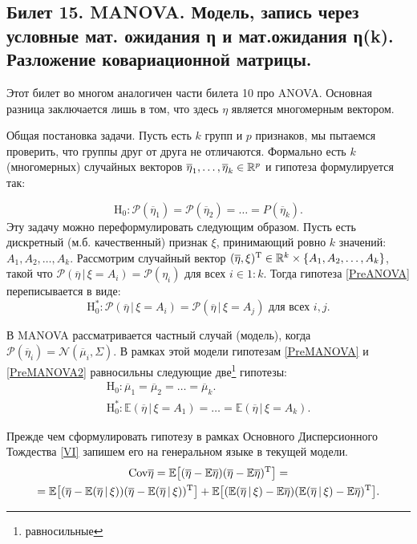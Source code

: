 \subsection{ Билет 15. MANOVA. Модель, запись через условные мат. ожидания η и мат.ожидания
η(k). Разложение ковариационной матрицы. }
Этот билет во многом аналогичен части билета 10 про ANOVA.
Основная разница заключается лишь в том, что здесь $\eta$ является многомерным вектором.

Общая постановка задачи.
Пусть есть $k$ групп и $p$ признаков, мы пытаемся проверить, что группы друг от друга не отличаются.
Формально есть $k$ (многомерных) случайных векторов $\overline \eta_1, \ldots, \overline \eta_k \in \mathbb{R}^p$ и гипотеза формулируется так:

\begin{equation}
    \label{PreMANOVA}
    \mathrm H_0: \mathcal P(\overline \eta_1) = \mathcal P(\overline \eta_2) = \ldots \mathcal = P(\overline \eta_k).
\end{equation}
Эту задачу можно переформулировать следующим образом.
Пусть есть дискретный (м.б. качественный) признак $\xi$, принимающий ровно $k$ значений: $A_1, A_2, \ldots, A_k$.
Рассмотрим случайный вектор $(\overline \eta, \xi)^{\mathrm{T}} \in \mathbb{R}^k \times \{A_1, A_2, \ldots, A_k\}$,
такой что $\mathcal P(\overline \eta \, | \, \xi = A_i) = \mathcal P(\eta_i)$ для всех $i \in 1:k$.
Тогда гипотеза \eqref{PreANOVA} переписывается в виде:
\begin{equation}
    \label{PreMANOVA2}
    \mathrm H_0^*: \mathcal P(\overline \eta \, | \, \xi = A_i) = \mathcal P(\overline \eta \, | \, \xi = A_j) \text{ для всех $i, j$}.
\end{equation}

В MANOVA рассматривается частный случай (модель), когда $\mathcal P(\overline \eta_i) = \mathcal N(\overline \mu_i, \Sigma)$.
В рамках этой модели гипотезам \eqref{PreMANOVA} и \eqref{PreMANOVA2} равносильны следующие две\footnote{равносильные} гипотезы:
\begin{gather}
    \label{MANOVA}
    \mathrm H_0: \overline \mu_1 = \overline \mu_2 = \ldots = \overline \mu_k.\\
    \mathrm H_0^*: \mathbb E (\overline \eta \, | \, \xi = A_1) = \ldots = \mathbb E (\overline \eta \, | \, \xi = A_k).
    \nonumber
\end{gather}

Прежде чем сформулировать гипотезу в рамках Основного Дисперсионного Тождества \eqref{VI} запишем его на генеральном языке
в текущей модели.
\begin{gather}
    \label{MANOVA_VI_gen}
    \mathrm {Cov} \overline \eta =
    \mathbb E \big[(\overline \eta - \mathbb E \overline \eta) (\overline \eta - \mathbb E \overline \eta)^{\mathrm{T}}\big] = \\ =
    \mathbb E \big[(\overline \eta - \mathbb E (\overline \eta \, | \, \xi))
              (\overline \eta - \mathbb E (\overline \eta \, | \, \xi))^{\mathrm{T}}\big] +
    \mathbb E \big[(\mathbb E (\overline \eta \, | \, \xi) - \mathbb E \overline \eta)
              (\mathbb E (\overline \eta \, | \, \xi) - \mathbb E \overline \eta)^{\mathrm{T}}\big].
\end{gather}

